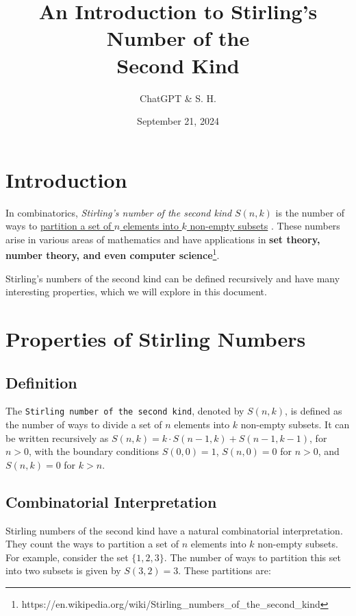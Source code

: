 \documentclass[11pt]{article}
\title{An Introduction to Stirling’s Number of the \\Second Kind}
\author{ChatGPT \& S. H.}
\date{September 21, 2024}
\begin{document}
\maketitle

\section{Introduction}
In combinatorics, \textit{Stirling’s number of the second kind} $S(n, k)$ is the number of ways to \underline{partition a set of $n$ elements into $k$ non-empty subsets} \cite{wiki}. These numbers arise in various areas of mathematics and have applications in \textbf{set theory, number theory, and even computer science}\footnote{https://en.wikipedia.org/wiki/Stirling_numbers_of_the_second_kind}.

Stirling’s numbers of the second kind can be defined recursively and have many interesting properties, which we will explore in this document.

\section{Properties of Stirling Numbers}



\subsection{Definition}
The \texttt{Stirling number of the second kind}, denoted by $S(n, k)$, is defined as the number of ways to divide a set of $n$ elements into $k$ non-empty subsets. It can be written recursively as $S(n, k) = k \cdot S(n-1, k) + S(n-1, k-1)$, for $n > 0$, with the boundary conditions $S(0,0) = 1$, $S(n, 0) = 0$ for $n > 0$, and $S(n, k) = 0$ for $k > n$.

\subsection{Combinatorial Interpretation}
Stirling numbers of the second kind have a natural combinatorial interpretation. They count the ways to partition a set of $n$ elements into $k$ non-empty subsets. For example, consider the set $\{1, 2, 3\}$. The number of ways to partition this set into two subsets is given by $S(3, 2) = 3$. These partitions are:

\begin{itemize}
    \item $\{1\}, \{2, 3\}$ 
    \item ${\{2\}, \{1, 3\}$
    \item $\{3\}, \{1, 2\}$
\end{itemize}
\end{document}
